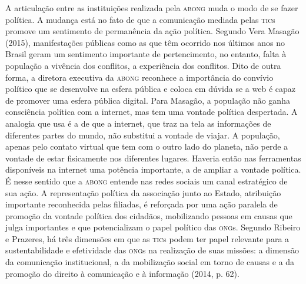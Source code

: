 A articulação entre as instituições realizada pela \textsc{abong} muda o modo de
se fazer política. A mudança está no fato de que a comunicação mediada
pelas \textsc{tic}s promove um sentimento de permanência da ação política.
Segundo Vera Masagão (2015), manifestações públicas como as que têm
ocorrido nos últimos anos no Brasil geram um sentimento importante de
pertencimento, no entanto, falta à população a vivência dos conflitos, a
experiência dos conflitos. Dito de outra forma, a diretora executiva da
\textsc{abong} reconhece a importância do convívio político que se desenvolve na
esfera pública e coloca em dúvida se a web é capaz de promover uma
esfera pública digital. Para Masagão, a população não ganha consciência
política com a internet, mas tem uma vontade política despertada. A
analogia que usa é a de que a internet, que traz na tela as informações
de diferentes partes do mundo, não substitui a vontade de viajar. A
população, apenas pelo contato virtual que tem com o outro lado do
planeta, não perde a vontade de estar fisicamente nos diferentes
lugares. Haveria então nas ferramentas disponíveis na internet uma
potência importante, a de ampliar a vontade política. É nesse sentido
que a \textsc{abong} entende nas redes sociais um canal estratégico de sua ação.
A representação política da associação junto ao Estado, atribuição
importante reconhecida pelas filiadas, é reforçada por uma ação paralela
de promoção da vontade política dos cidadãos, mobilizando pessoas em
causas que julga importantes e que potencializam o papel político das
\textsc{ong}s. Segundo Ribeiro e Prazeres, há três dimensões em que as \textsc{tic}s podem
ter papel relevante para a sustentabilidade e efetividade das \textsc{ong}s na
realização de suas missões: a dimensão da comunicação institucional, a
da mobilização social em torno de causas e a da promoção do direito à
comunicação e à informação (2014, p. 62).

